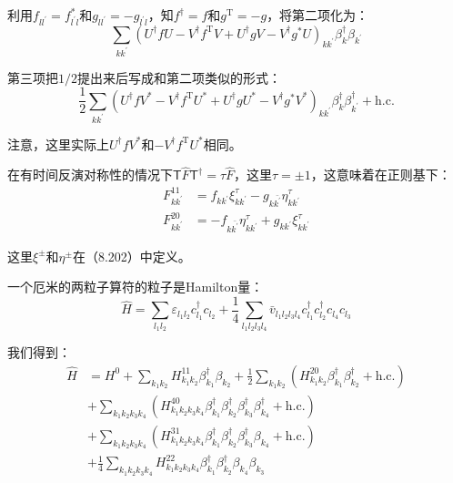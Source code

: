 \begin{booknote*}
利用$f_{ll^{\prime}}=f^{*}_{l^{\prime}l}$和$g_{ll^{\prime}}=-g_{l^{\prime}l}$，知$f^{\dagger}=f$和$g^{\mathrm{T}}=-g$，将第二项化为：
\[
\sum_{kk^{\prime}}(U^{\dagger}fU-V^{\dagger}f^{\mathrm{T}}V+U^{\dagger}gV-V^{\dagger}g^{*}U)_{kk^{\prime}}\beta^{\dagger}_{k}\beta_{k^{\prime}}
\]

第三项把$1/2$提出来后写成和第二项类似的形式：
\[
\frac{1}{2}\sum_{kk^{\prime}}(U^{\dagger}fV^{*}-V^{\dagger}f^{\mathrm{T}}U^{*}+U^{\dagger}gU^{*}-V^{\dagger}g^{*}V^{*})_{kk^{\prime}}\beta^{\dagger}_{k}\beta^{\dagger}_{k^{\prime}}+\text{h.c.}
\]

注意，这里实际上$U^{\dagger}fV^{*}$和$-V^{\dagger}f^{\mathrm{T}}U^{*}$相同。
\end{booknote*}
在有时间反演对称性的情况下$\mathsf{T}\hat{F}\mathsf{T}^{\dagger}=\tau\hat{F}$，这里$\tau=\pm1$，这意味着在正则基下：
\begin{align*}
F^{11}_{kk^{\prime}} & =f_{kk^{\prime}}\xi^{\tau}_{kk^{\prime}}-g_{k\bar{k^{\prime}}}\eta^{\tau}_{kk^{\prime}}\\
F^{20}_{kk^{\prime}} & =-f_{k\bar{k^{\prime}}}\eta^{\tau}_{kk^{\prime}}+g_{kk^{\prime}}\xi^{\tau}_{kk^{\prime}}
\end{align*}

这里$\xi^{\pm}$和$\eta^{\pm}$在（8.202）中定义。

一个厄米的两粒子算符的粒子是Hamilton量：
\[
\hat{H}=\sum_{l_{1}l_{2}}\varepsilon_{l_{1}l_{2}}c^{\dagger}_{l_{1}}c_{l_{2}}+\frac{1}{4}\sum_{l_{1}l_{2}l_{3}l_{4}}\bar{v}_{l_{1}l_{2}l_{3}l_{4}}c^{\dagger}_{l_{1}}c^{\dagger}_{l_{2}}c_{l_{4}}c_{l_{3}}
\]

我们得到：
\begin{align}
\hat{H} & =H^{0}+\sum_{k_{1}k_{2}}H^{11}_{k_{1}k_{2}}\beta^{\dagger}_{k_{1}}\beta_{k_{2}}+\frac{1}{2}\sum_{k_{1}k_{2}}(H^{20}_{k_{1}k_{2}}\beta^{\dagger}_{k_{1}}\beta^{\dagger}_{k_{2}}+\text{h.c.})\nonumber \\
 & +\sum_{k_{1}k_{2}k_{3}k_{4}}(H^{40}_{k_{1}k_{2}k_{3}k_{4}}\beta^{\dagger}_{k_{1}}\beta^{\dagger}_{k_{2}}\beta^{\dagger}_{k_{3}}\beta^{\dagger}_{k_{4}}+\text{h.c.})\nonumber \\
 & +\sum_{k_{1}k_{2}k_{3}k_{4}}(H^{31}_{k_{1}k_{2}k_{3}k_{4}}\beta^{\dagger}_{k_{1}}\beta^{\dagger}_{k_{2}}\beta^{\dagger}_{k_{3}}\beta_{k_{4}}+\text{h.c.})\nonumber \\
 & +\frac{1}{4}\sum_{k_{1}k_{2}k_{3}k_{4}}H^{22}_{k_{1}k_{2}k_{3}k_{4}}\beta^{\dagger}_{k_{1}}\beta^{\dagger}_{k_{2}}\beta_{k_{4}}\beta_{k_{3}}\label{eq:quasi-particle Hamiltonian}
\end{align}

